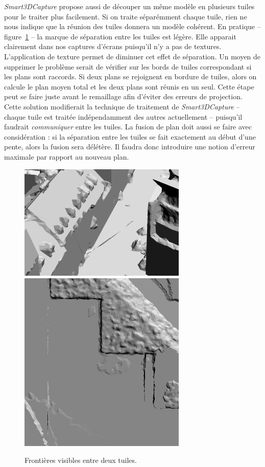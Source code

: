 ﻿\documentclass[12pt, twoside]{article}
\begin{document}
\textit{Smart3DCapture} propose aussi de découper un même modèle en plusieurs tuiles pour le traiter plus facilement. Si on traite séparémment chaque tuile, rien ne nous indique que la réunion des tuiles donnera un modèle cohérent. En pratique -- figure~\ref{fig:tuiles} -- la marque de séparation entre les tuiles est légère. Elle apparait clairement dans nos captures d'écrans puisqu'il n'y a pas de textures. L'application de texture permet de diminuer cet effet de séparation. Un moyen de supprimer le problème serait de vérifier sur les bords de tuiles correspondant si les plans sont raccords. Si deux plans se rejoignent en bordure de tuiles, alors on calcule le plan moyen total et les deux plans sont réunis en un seul. Cette étape peut se faire juste avant le remaillage afin d'éviter des erreurs de projection. Cette solution modifierait la technique de traitement de \textit{Smart3DCapture} -- chaque tuile est traitée indépendamment des autres actuellement -- puisqu'il faudrait \textit{communiquer} entre les tuiles. La fusion de plan doit aussi se faire avec considération : si la séparation entre les tuiles se fait exactement au début d'une pente, alors la fusion sera délétère. Il faudra donc introduire une notion d'erreur maximale par rapport au nouveau plan.

\begin{figure}[h]
\centering
\includegraphics[width=8cm,keepaspectratio]{tuile1.png} \includegraphics[width=8cm,keepaspectratio]{tuile2.png} 
\caption{Frontières visibles entre deux tuiles.}
\label{fig:tuiles}
\end{figure}
\end{document}
